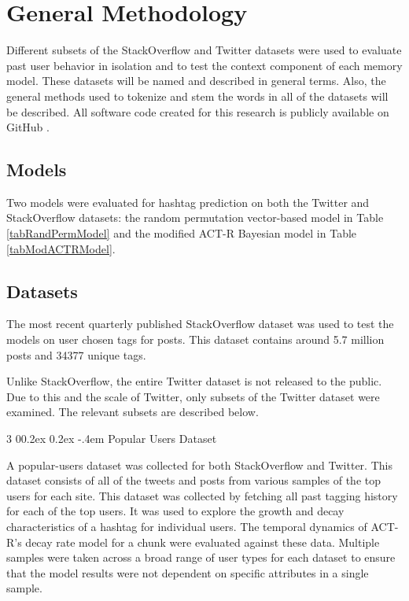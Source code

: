 \documentclass[man,floatsintext,donotrepeattitle]{apa6}
\makeatletter
\renewcommand{\subsubsection}{%
  \@startsection
  {subsubsection}%
  {3}%
  {\parindent}%
  {0\baselineskip \@plus 0.2ex \@minus 0.2ex}%
  {-.4em}%
  {\normalfont\normalsize\bfseries\addperi}}
\makeatother
\begin{document}
\section{General Methodology}

Different subsets of the StackOverflow and Twitter datasets were used to evaluate past user behavior in isolation and to test the context component of each memory model.
These datasets will be named and described in general terms.
Also, the general methods used to tokenize and stem the words in all of the datasets will be described.
All software code created for this research is publicly available on GitHub \parencite{StanleyRepo2014}.

\subsection{Models}

Two models were evaluated for hashtag prediction on both the Twitter and StackOverflow datasets:
the random permutation vector-based model \parencite{Sahlgren2008} in Table \ref{tabRandPermModel} and 
the modified ACT-R Bayesian model \parencite{Stanley2013} in Table \ref{tabModACTRModel}.

\subsection{Datasets}

The most recent quarterly published StackOverflow dataset \parencite{DataDump2014} was used to test the models on user chosen tags for posts.
This dataset contains around \num{5.7} million posts and \num{34377} unique tags.

Unlike StackOverflow, the entire Twitter dataset is not released to the public.
Due to this and the scale of Twitter, only subsets of the Twitter dataset were examined.
The relevant subsets are described below.

\subsubsection{Popular Users Dataset}

A popular-users dataset was collected for both StackOverflow and Twitter.
This dataset consists of all of the tweets and posts from various samples of the top users for each site.
This dataset was collected by fetching all past tagging history for each of the top users.
It was used to explore the growth and decay characteristics of a hashtag for individual users.
The temporal dynamics of ACT-R's decay rate model for a chunk were evaluated against these data.
Multiple samples were taken across a broad range of user types for each dataset to ensure that the model results were not dependent on specific attributes in a single sample.
\end{document}
